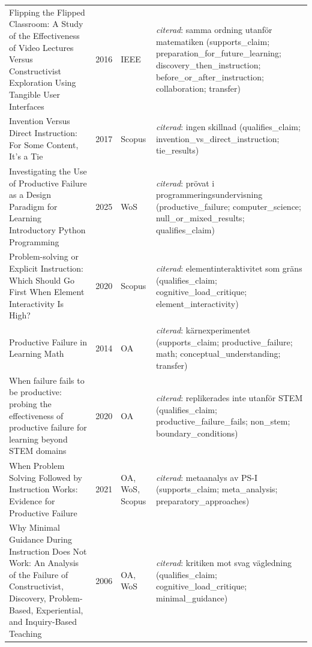 \begin{longtable}{@{}%
  >{\raggedright\arraybackslash}p{}c%
  >{\raggedright\arraybackslash}p{}%
  >{\raggedright\arraybackslash\footnotesize}p{}@{}}
Flipping the Flipped Classroom: A Study of the Effectiveness of Video Lectures Versus Constructivist Exploration Using Tangible User Interfaces & 2016 & IEEE & \emph{citerad}: samma ordning utanför matematiken (supports\_\allowbreak{}claim; preparation\_\allowbreak{}for\_\allowbreak{}future\_\allowbreak{}learning; discovery\_\allowbreak{}then\_\allowbreak{}instruction; before\_\allowbreak{}or\_\allowbreak{}after\_\allowbreak{}instruction; collaboration; transfer) \\
Invention Versus Direct Instruction: For Some Content, It's a Tie & 2017 & Scopus & \emph{citerad}: ingen skillnad (qualifies\_\allowbreak{}claim; invention\_\allowbreak{}vs\_\allowbreak{}direct\_\allowbreak{}instruction; tie\_\allowbreak{}results) \\
Investigating the Use of Productive Failure as a Design Paradigm for Learning Introductory Python Programming & 2025 & WoS & \emph{citerad}: prövat i programmeringsundervisning (productive\_\allowbreak{}failure; computer\_\allowbreak{}science; null\_\allowbreak{}or\_\allowbreak{}mixed\_\allowbreak{}results; qualifies\_\allowbreak{}claim) \\
Problem-solving or Explicit Instruction: Which Should Go First When Element Interactivity Is High? & 2020 & Scopus & \emph{citerad}: elementinteraktivitet som gräns (qualifies\_\allowbreak{}claim; cognitive\_\allowbreak{}load\_\allowbreak{}critique; element\_\allowbreak{}interactivity) \\
Productive Failure in Learning Math & 2014 & OA & \emph{citerad}: kärnexperimentet (supports\_\allowbreak{}claim; productive\_\allowbreak{}failure; math; conceptual\_\allowbreak{}understanding; transfer) \\
When failure fails to be productive: probing the effectiveness of productive failure for learning beyond STEM domains & 2020 & OA & \emph{citerad}: replikerades inte utanför STEM (qualifies\_\allowbreak{}claim; productive\_\allowbreak{}failure\_\allowbreak{}fails; non\_\allowbreak{}stem; boundary\_\allowbreak{}conditions) \\
When Problem Solving Followed by Instruction Works: Evidence for Productive Failure & 2021 & OA, WoS, Scopus & \emph{citerad}: metaanalys av PS-I (supports\_\allowbreak{}claim; meta\_\allowbreak{}analysis; preparatory\_\allowbreak{}approaches) \\
Why Minimal Guidance During Instruction Does Not Work: An Analysis of the Failure of Constructivist, Discovery, Problem-Based, Experiential, and Inquiry-Based Teaching & 2006 & OA, WoS & \emph{citerad}: kritiken mot svag vägledning (qualifies\_\allowbreak{}claim; cognitive\_\allowbreak{}load\_\allowbreak{}critique; minimal\_\allowbreak{}guidance) \\

\end{longtable}
